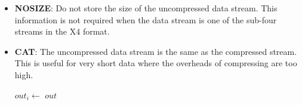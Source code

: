 \documentclass[a4paper]{article}
\begin{document}
\begin{itemize}
\item{\textbf{NOSIZE}:}
Do not store the size of the uncompressed data stream.  This
information is not required when the data stream is one of the
sub-four streams in the X4 format.

\item{\textbf{CAT}:}
The uncompressed data stream is the same as the compressed stream.
This is useful for very short data where the overheads of compressing
are too high.

\begin{algorithmic}[1]
    \State $out_i \gets $
  \EndFor
  \State \Return $out$
\EndFunction
\end{algorithmic}

%
%
%
%


\end{itemize}
\end{document}
